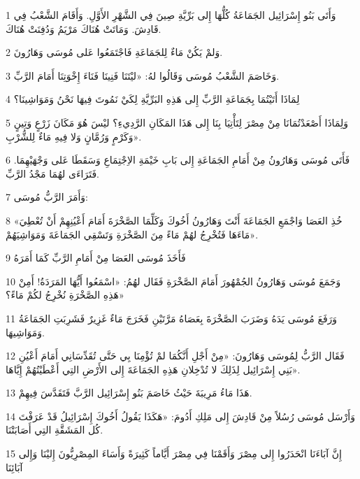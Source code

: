 \par 1 وَأَتَى بَنُو إِسْرَائِيل الجَمَاعَةُ كُلُّهَا إِلى بَرِّيَّةِ صِينَ فِي الشَّهْرِ الأَوَّلِ. وَأَقَامَ الشَّعْبُ فِي قَادِشَ. وَمَاتَتْ هُنَاكَ مَرْيَمُ وَدُفِنَتْ هُنَاكَ.
\par 2 وَلمْ يَكُنْ مَاءٌ لِلجَمَاعَةِ فَاجْتَمَعُوا عَلى مُوسَى وَهَارُونَ.
\par 3 وَخَاصَمَ الشَّعْبُ مُوسَى وَقَالُوا لهُ: «ليْتَنَا فَنِينَا فَنَاءَ إِخْوَتِنَا أَمَامَ الرَّبِّ.
\par 4 لِمَاذَا أَتَيْتُمَا بِجَمَاعَةِ الرَّبِّ إِلى هَذِهِ البَرِّيَّةِ لِكَيْ نَمُوتَ فِيهَا نَحْنُ وَمَوَاشِينَا؟
\par 5 وَلِمَاذَا أَصْعَدْتُمَانَا مِنْ مِصْرَ لِتَأْتِيَا بِنَا إِلى هَذَا المَكَانِ الرَّدِيءِ؟ ليْسَ هُوَ مَكَانَ زَرْعٍ وَتِينٍ وَكَرْمٍ وَرُمَّانٍ وَلا فِيهِ مَاءٌ لِلشُّرْبِ».
\par 6 فَأَتَى مُوسَى وَهَارُونُ مِنْ أَمَامِ الجَمَاعَةِ إِلى بَابِ خَيْمَةِ الاِجْتِمَاعِ وَسَقَطَا عَلى وَجْهَيْهِمَا. فَتَرَاءَى لهُمَا مَجْدُ الرَّبِّ.
\par 7 وَأَمَرَ الرَّبُّ مُوسَى:
\par 8 «خُذِ العَصَا وَاجْمَعِ الجَمَاعَةَ أَنْتَ وَهَارُونُ أَخُوكَ وَكَلِّمَا الصَّخْرَةَ أَمَامَ أَعْيُنِهِمْ أَنْ تُعْطِيَ مَاءَهَا فَتُخْرِجُ لهُمْ مَاءً مِنَ الصَّخْرَةِ وَتَسْقِي الجَمَاعَةَ وَمَوَاشِيَهُمْ».
\par 9 فَأَخَذَ مُوسَى العَصَا مِنْ أَمَامِ الرَّبِّ كَمَا أَمَرَهُ
\par 10 وَجَمَعَ مُوسَى وَهَارُونُ الجُمْهُورَ أَمَامَ الصَّخْرَةِ فَقَال لهُمُ: «اسْمَعُوا أَيُّهَا المَرَدَةُ! أَمِنْ هَذِهِ الصَّخْرَةِ نُخْرِجُ لكُمْ مَاءً؟»
\par 11 وَرَفَعَ مُوسَى يَدَهُ وَضَرَبَ الصَّخْرَةَ بِعَصَاهُ مَرَّتَيْنِ فَخَرَجَ مَاءٌ غَزِيرٌ فَشَرِبَتِ الجَمَاعَةُ وَمَوَاشِيهَا.
\par 12 فَقَال الرَّبُّ لِمُوسَى وَهَارُونَ: «مِنْ أَجْلِ أَنَّكُمَا لمْ تُؤْمِنَا بِي حَتَّى تُقَدِّسَانِي أَمَامَ أَعْيُنِ بَنِي إِسْرَائِيل لِذَلِكَ لا تُدْخِلانِ هَذِهِ الجَمَاعَةَ إِلى الأَرْضِ التِي أَعْطَيْتُهُمْ إِيَّاهَا».
\par 13 هَذَا مَاءُ مَرِيبَةَ حَيْثُ خَاصَمَ بَنُو إِسْرَائِيل الرَّبَّ فَتَقَدَّسَ فِيهِمْ.
\par 14 وَأَرْسَل مُوسَى رُسُلاً مِنْ قَادِشَ إِلى مَلِكِ أَدُومَ: «هَكَذَا يَقُولُ أَخُوكَ إِسْرَائِيلُ قَدْ عَرَفْتَ كُل المَشَقَّةِ التِي أَصَابَتْنَا.
\par 15 إِنَّ آبَاءَنَا انْحَدَرُوا إِلى مِصْرَ وَأَقَمْنَا فِي مِصْرَ أَيَّاماً كَثِيرَةً وَأَسَاءَ المِصْرِيُّونَ إِليْنَا وَإِلى آبَائِنَا
